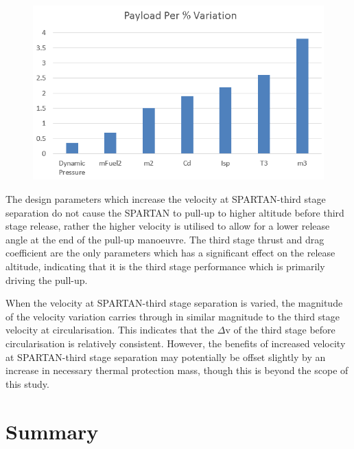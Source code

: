 \begin{figure}[ht!]
\centering
\includegraphics[width=0.7\linewidth]{figures/5_Ascent/BarChartRelativePayloadChange}
\caption{}
\label{fig:BarChartRelativePayloadChange}
\end{figure}



The design parameters which increase the velocity at SPARTAN-third stage separation do not cause the SPARTAN to pull-up to higher altitude before third stage release, rather the higher velocity is utilised to allow for a lower release angle at the end of the pull-up manoeuvre. The third stage thrust and drag coefficient are the only parameters which has a significant effect on the release altitude, indicating that it is the third stage performance which is primarily driving the pull-up. 

When the velocity at SPARTAN-third stage separation is varied, the magnitude of the velocity variation carries through in similar magnitude to the third stage velocity at circularisation. This indicates that the $\Delta$v of the third stage before circularisation is relatively consistent. However, the benefits of increased velocity at SPARTAN-third stage separation may potentially be offset slightly by an increase in necessary thermal protection mass, though this is beyond the scope of this study.




\section{Summary}



